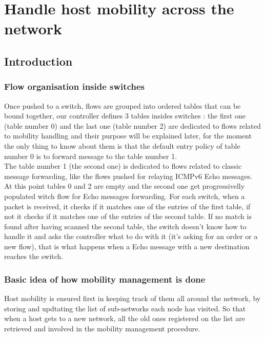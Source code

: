\documentclass{article}
\begin{document}
\section{Handle host mobility across the network}

\subsection{Introduction}

\subsubsection{Flow organisation inside switches}
Once pushed to a switch, flows are grouped into ordered tables that
can be bound together, our controller defines 3 tables insides
switches : the first one (table number 0) and the last one (table
number 2) are dedicated to flows related to mobility handling and
their purpose will be explained later, for the moment the only thing
to know about them is that the default entry policy of table number 0
is to forward message to the table number 1.\\
\newline
The table number 1 (the second one) is dedicated to flows related to
classic message forwarding, like the flows pushed for relaying ICMPv6
Echo messages. At this point tables 0 and 2 are empty and the second
one get progressivelly populated witch flow for Echo messages
forwarding. For each switch, when a packet is received, it checks if
it matches one of the entries of the first table, if not it checks if
it matches one of the entries of the second table. If no match is
found after having scanned the second table, the switch doesn't know
how to handle it and asks the controller what to do with it (it's
asking for an order or a new flow), that is what happens when a Echo
message with a new destination reaches the switch.

\subsubsection{Basic idea of how mobility management is done}

Host mobility is ensured first in keeping track of them all around the
network, by storing and updtating the list of sub-networks each node
has visited. So that when a host gets to a new network, all the old
ones registered on the list are retrieved and involved in the mobility
management procedure.
\end{document}
